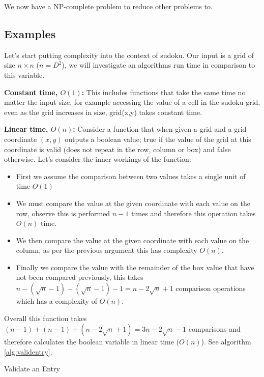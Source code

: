 \documentclass[a4paper,11pt]{report}
\newcounter{row}
\newcounter{col}
\begin{document}
We now have a NP-complete problem to reduce other problems to.

\subsection{Examples}

Let's start putting complexity into the context of sudoku. Our input is a grid of size $n\times n$ ($n=D^2$), we will investigate an algorithms run time in comparison to this variable.

\textbf{Constant time, $O(1)$:} This includes functions that take the same time no matter the input size, for example accessing the value of a cell in the sudoku grid, even as the grid increases in size, grid(x,y) takes constant time.

\textbf{Linear time, $O(n)$:} Consider a function that when given a grid and a grid coordinate $(x,y)$ outputs a boolean value; true if the value of the grid at this coordinate is valid (does not repeat in the row, column or box) and false otherwise. Let's consider the inner workings of the function: 
\begin{itemize}
\item First we assume the comparison between two values takes a single unit of time $O(1)$
\item We must compare the value at the given coordinate with each value on the row, observe this is performed $n-1$ times and therefore this operation takes $O(n)$ time.
\item We then compare the value at the given coordinate with each value on the column, as per the previous argument this has complexity $O(n)$.
\item Finally we compare the value with the remainder of the box value that have not been compared previously, this takes $n-(\sqrt{n}-1)-(\sqrt{n}-1)-1= n-2\sqrt{n}+1$ comparison operations which has a complexity of $O(n)$.
\end{itemize}
Overall this function takes $(n-1)+(n-1)+(n-2\sqrt{n}+1) = 3n -2\sqrt{n}-1$ comparisons and therefore calculates the boolean variable in linear time ($O(n)$). See algorithm \ref{alg:validentry}.

\begin{algorithm}
\caption{Validate an Entry}\label{alg:validentry}
\begin{algorithmic}
	 
			\EndIf
		\EndIf
	\EndFor
	 
			\EndIf
		\EndIf
	\EndFor
	 
				\EndIf
			\EndIf
		\EndFor {}
	\EndFor
\EndProcedure
\end{algorithmic}
\end{algorithm}
\end{document}
